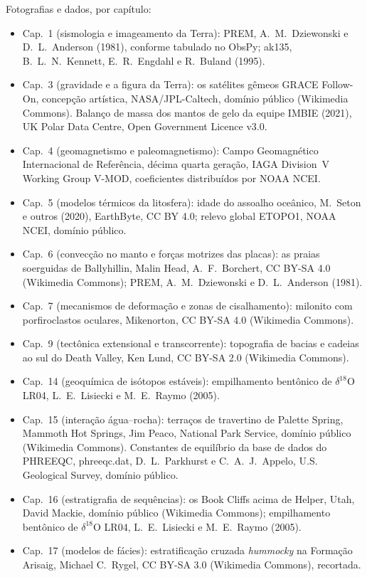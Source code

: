 \bigskip
\noindent Fotografias e dados, por capítulo:
\begin{itemize}\small
  \item Cap.~1 (sismologia e imageamento da Terra): PREM, A.~M.~Dziewonski e D.~L.~Anderson (1981), conforme tabulado no ObsPy; ak135, B.~L.~N.~Kennett, E.~R.~Engdahl e R.~Buland (1995).
  \item Cap.~3 (gravidade e a figura da Terra): os satélites gêmeos GRACE Follow-On, concepção artística, NASA/JPL-Caltech, domínio público (Wikimedia Commons). Balanço de massa dos mantos de gelo da equipe IMBIE (2021), UK Polar Data Centre, Open Government Licence v3.0.
  \item Cap.~4 (geomagnetismo e paleomagnetismo): Campo Geomagnético Internacional de Referência, décima quarta geração, IAGA Division~V Working Group V-MOD, coeficientes distribuídos por NOAA NCEI.
  \item Cap.~5 (modelos térmicos da litosfera): idade do assoalho oceânico, M.~Seton e outros (2020), EarthByte, CC BY 4.0; relevo global ETOPO1, NOAA NCEI, domínio público.
  \item Cap.~6 (convecção no manto e forças motrizes das placas): as praias soerguidas de Ballyhillin, Malin Head, A.~F.~Borchert, CC BY-SA 4.0 (Wikimedia Commons); PREM, A.~M.~Dziewonski e D.~L.~Anderson (1981).
  \item Cap.~7 (mecanismos de deformação e zonas de cisalhamento): milonito com porfiroclastos oculares, Mikenorton, CC BY-SA 4.0 (Wikimedia Commons).
  \item Cap.~9 (tectônica extensional e transcorrente): topografia de bacias e cadeias ao sul do Death Valley, Ken Lund, CC BY-SA 2.0 (Wikimedia Commons).
  \item Cap.~14 (geoquímica de isótopos estáveis): empilhamento bentônico de $\delta^{18}$O LR04, L.~E.~Lisiecki e M.~E.~Raymo (2005).
  \item Cap.~15 (interação água--rocha): terraços de travertino de Palette Spring, Mammoth Hot Springs, Jim Peaco, National Park Service, domínio público (Wikimedia Commons). Constantes de equilíbrio da base de dados do PHREEQC, phreeqc.dat, D.~L.~Parkhurst e C.~A.~J.~Appelo, U.S. Geological Survey, domínio público.
  \item Cap.~16 (estratigrafia de sequências): os Book Cliffs acima de Helper, Utah, David Mackie, domínio público (Wikimedia Commons); empilhamento bentônico de $\delta^{18}$O LR04, L.~E.~Lisiecki e M.~E.~Raymo (2005).
  \item Cap.~17 (modelos de fácies): estratificação cruzada \emph{hummocky} na Formação Arisaig, Michael C.~Rygel, CC BY-SA 3.0 (Wikimedia Commons), recortada.

\end{itemize}
